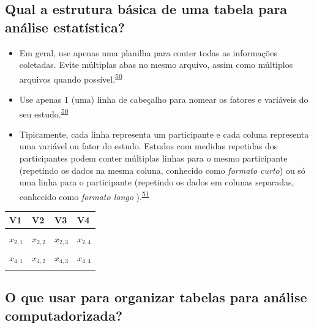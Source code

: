 \documentclass[
]{book}
\begin{document}
\hypertarget{qual-a-estrutura-buxe1sica-de-uma-tabela-para-anuxe1lise-estatuxedstica}{%
\subsection{Qual a estrutura básica de uma tabela para análise estatística?}\label{qual-a-estrutura-buxe1sica-de-uma-tabela-para-anuxe1lise-estatuxedstica}}

\begin{itemize}
\item
  Em geral, use apenas uma planilha para conter todas as informações coletadas. Evite múltiplas abas no mesmo arquivo, assim como múltiplos arquivos quando possível.\textsuperscript{\protect\hyperlink{ref-broman2018}{50}}
\item
  Use apenas 1 (uma) linha de cabeçalho para nomear os fatores e variáveis do seu estudo.\textsuperscript{\protect\hyperlink{ref-broman2018}{50}}
\item
  Tipicamente, cada linha representa um participante e cada coluna representa uma variável ou fator do estudo. Estudos com medidas repetidas dos participantes podem conter múltiplas linhas para o mesmo participante (repetindo os dados na mesma coluna, conhecido como \emph{formato curto}) ou só uma linha para o participante (repetindo os dados em colunas separadas, conhecido como \emph{formato longo} ).\textsuperscript{\protect\hyperlink{ref-Juluru2015}{51}}
\end{itemize}

\begin{tabu} to 
\toprule
\textbf{V1} & \textbf{V2} & \textbf{V3} & \textbf{V4}\\
\midrule
{} &  &  & \\
$x_{2,1}$ & $x_{2,2}$ & $x_{2,3}$ & $x_{2,4}$\\
 &  &  & \\
$x_{4,1}$ & $x_{4,2}$ & $x_{4,3}$ & $x_{4,4}$\\
 &  &  & \\
\bottomrule
\end{tabu}

\hypertarget{o-que-usar-para-organizar-tabelas-para-anuxe1lise-computadorizada}{%
\subsection{O que usar para organizar tabelas para análise computadorizada?}\label{o-que-usar-para-organizar-tabelas-para-anuxe1lise-computadorizada}}
\end{document}
